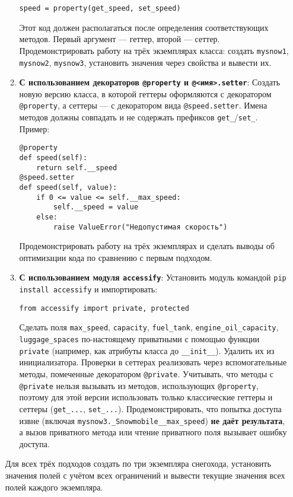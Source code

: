 \begin{enumerate}
\begin{enumerate}
\begin{verbatim}
speed = property(get_speed, set_speed)
    \end{verbatim}  
    Этот код должен располагаться после определения соответствующих методов. Первый аргумент — геттер, второй — сеттер.  
    Продемонстрировать работу на трёх экземплярах класса: создать \texttt{mysnow1}, \texttt{mysnow2}, \texttt{mysnow3}, установить значения через свойства и вывести их.
    \item \textbf{С использованием декораторов \texttt{@property} и \texttt{@<имя>.setter}}:  
    Создать новую версию класса, в которой геттеры оформляются с декоратором \texttt{@property}, а сеттеры — с декоратором вида \texttt{@speed.setter}. Имена методов должны совпадать и не содержать префиксов \texttt{get\_}/\texttt{set\_}.  
    Пример:  
    \begin{verbatim}
@property
def speed(self):
    return self.__speed
@speed.setter
def speed(self, value):
    if 0 <= value <= self.__max_speed:
        self.__speed = value
    else:
        raise ValueError("Недопустимая скорость")
    \end{verbatim}  
    Продемонстрировать работу на трёх экземплярах и сделать выводы об оптимизации кода по сравнению с первым подходом.
    \item \textbf{С использованием модуля \texttt{accessify}}:  
    Установить модуль командой \texttt{pip install accessify} и импортировать:  
    \begin{verbatim}
from accessify import private, protected
    \end{verbatim}  
    Сделать поля \texttt{max\_speed}, \texttt{capacity}, \texttt{fuel\_tank}, \texttt{engine\_oil\_capacity}, \texttt{luggage\_spaces} по-настоящему приватными с помощью функции \texttt{private} (например, как атрибуты класса до \texttt{\_\_init\_\_}). Удалить их из инициализатора.  
    Проверки в сеттерах реализовать через вспомогательные методы, помеченные декоратором \texttt{@private}.  
    Учитывать, что методы с \texttt{@private} нельзя вызывать из методов, использующих \texttt{@property}, поэтому для этой версии использовать только классические геттеры и сеттеры (\texttt{get\_...}, \texttt{set\_...}).  
    Продемонстрировать, что попытка доступа извне (включая \texttt{mysnow3.\_Snowmobile\_\_max\_speed}) \textbf{не даёт результата}, а вызов приватного метода или чтение приватного поля вызывает ошибку доступа.
\end{enumerate}
Для всех трёх подходов создать по три экземпляра снегохода, установить значения полей с учётом всех ограничений и вывести текущие значения всех полей каждого экземпляра.

\end{enumerate}
